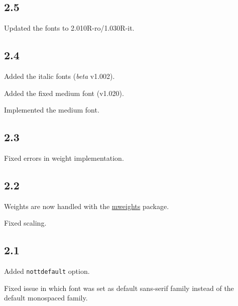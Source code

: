 \documentclass[10pt,a4paper,english]{article}
\begin{document}
\begin{multicols}{2}
\subsection*{2.5}
\begin{itemize*}
	\item Updated the fonts to 2.010R-ro/1.030R-it.
\end{itemize*}

\subsection*{2.4}
\begin{itemize*}
	\item Added the italic fonts (\emph{beta} v1.002).
	\item Added the fixed medium font (v1.020).
	\item Implemented the medium font.
\end{itemize*}

\subsection*{2.3}
\begin{itemize*}
	\item Fixed errors in weight implementation.
\end{itemize*}

\subsection*{2.2}
\begin{itemize*}
	\item Weights are now handled with the \href{http://www.ctan.org/pkg/mweights}{mweights} package.
	\item Fixed scaling.
\end{itemize*}

\subsection*{2.1}
\begin{itemize*}
	\item Added \texttt{nottdefault} option.
	\item Fixed issue in which font was set as default sans-serif family instead of the default monospaced family.
\end{itemize*}


\end{multicols}
\end{document}
